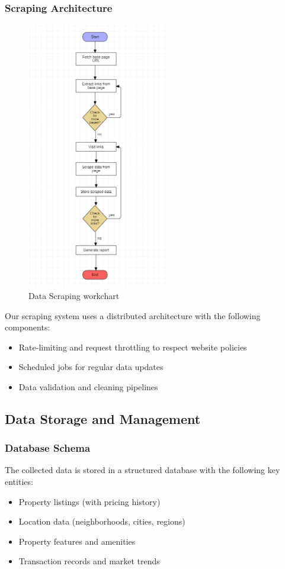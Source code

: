 \subsubsection{Scraping Architecture}
\begin{figure}[htbp]
    \centering
    \includegraphics[width=0.55\textwidth]{images/workchartscraper.png}
    \caption{Data Scraping workchart}
    \label{fig:scraping-workchart}
\end{figure}

Our scraping system uses a distributed architecture with the following components:
\begin{itemize}
    \item Rate-limiting and request throttling to respect website policies
    \item Scheduled jobs for regular data updates
    \item Data validation and cleaning pipelines
\end{itemize}

\subsection{Data Storage and Management}
\subsubsection{Database Schema}
The collected data is stored in a structured database with the following key entities:
\begin{itemize}
    \item Property listings (with pricing history)
    \item Location data (neighborhoods, cities, regions)
    \item Property features and amenities
    \item Transaction records and market trends
\end{itemize}

